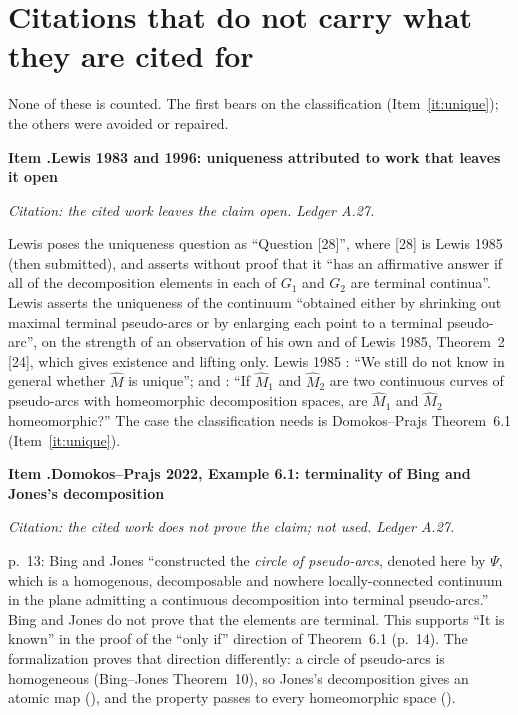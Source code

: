 \documentclass[11pt]{article}
\newcounter{defect}
\newenvironment{defect}[4]{%
  \par\addvspace{10pt}\refstepcounter{defect}%
  \noindent\textbf{Item \thedefect.\enspace #1}\par\nopagebreak
  \noindent\textit{#2}\par\nopagebreak\smallskip}{\par\addvspace{6pt}}
\begin{document}
\section{Citations that do not carry what they are cited for}\label{sec:cite}

None of these is counted. The first bears on the classification (Item~\ref{it:unique}); the others
were avoided or repaired.

\begin{defect}{Lewis 1983 and 1996: uniqueness attributed to work that leaves it open}{Citation:
the cited work leaves the claim open. Ledger A.27.}{0}{0}\label{it:lewis}
Lewis \cite[p.~80]{Lw83} poses the uniqueness question as ``Question [28]'', where [28] is Lewis
1985 (then submitted), and asserts without proof that it ``has an affirmative answer if all of the
decomposition elements in each of $G_1$ and $G_2$ are terminal continua''. Lewis \cite[p.~173]{Lw96} asserts the uniqueness of the continuum ``obtained either by
shrinking out maximal terminal pseudo-arcs or by enlarging each point to a terminal pseudo-arc'',
on the strength of an observation of his own and of Lewis 1985, Theorem~2 [24], which gives
existence and lifting only. Lewis 1985 \cite[p.~93]{Lw85}: ``We still do not know in general
whether $\hat M$ is unique''; and \cite[p.~99, Question 2]{Lw85}: ``If $\hat M_1$ and $\hat M_2$
are two continuous curves of pseudo-arcs with homeomorphic decomposition spaces, are $\hat M_1$
and $\hat M_2$ homeomorphic?'' The case the classification needs is Domokos--Prajs Theorem~6.1
(Item~\ref{it:unique}).
\end{defect}

\begin{defect}{Domokos--Prajs 2022, Example 6.1: terminality of Bing and Jones's
decomposition}{Citation: the cited work does not prove the claim; not used. Ledger A.27.}{0}{0}\label{it:dpex}
p.~13: Bing and Jones ``constructed the \emph{circle of pseudo-arcs}, denoted here by $\Psi$, which
is a homogenous, decomposable and nowhere locally-connected continuum in the plane admitting a
continuous decomposition into terminal pseudo-arcs.'' Bing and Jones do not prove that the
elements are terminal. This supports ``It is known'' in the proof of the ``only if'' direction of
Theorem~6.1 (p.~14). The formalization proves that direction differently: a circle of pseudo-arcs
is homogeneous (Bing--Jones Theorem~10), so Jones's decomposition gives an atomic map
(), and the property passes to every homeomorphic space
().
\end{defect}
\end{document}
